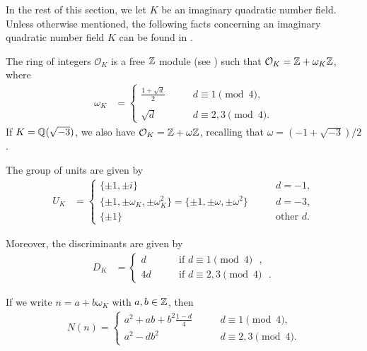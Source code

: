 \documentclass[twoside,leqno,10pt, A4]{amsart}
\begin{document}
In the rest of this section, we let $K$ be an imaginary quadratic number field. Unless otherwise mentioned, the following facts concerning an imaginary quadratic number field $K$ can be found in \cite[Section 3.8]{iwakow}. \newline

  The ring of integers $\mathcal{O}_K$ is a free $\mathbb Z$ module (see \cite[Section 3.8]{iwakow}) such that $\mathcal{O}_K=\mathbb Z+\omega_K \mathbb Z$, where
\begin{align*}
   \omega_K & =\begin{cases}
\displaystyle     \frac {1+\sqrt{d}}{2} \qquad & d \equiv 1 \pmod 4, \\ \\
     \sqrt{d} \qquad & d \equiv 2, 3 \pmod 4.
    \end{cases}
\end{align*}
If $K=\mathbb Q(\sqrt{-3})$, we also have $\mathcal{O}_K=\mathbb Z+\omega \mathbb Z$, recalling that $\omega=(-1+\sqrt{-3})/2$. \newline

   The group of units are given by
\begin{align}
\label{Uk}
   U_K & =\begin{cases}
     \{ \pm 1 , \pm i \} \qquad & d=-1, \\
     \{ \pm 1, \pm \omega_K, \pm \omega_K^2 \}=\{ \pm 1, \pm \omega, \pm \omega^2 \} \qquad & d=-3,  \\
     \{ \pm 1  \} \qquad & \text{other $d$}.
    \end{cases}
\end{align}

  Moreover, the discriminants are given by
\begin{align*}
   D_K & =\begin{cases}
     d \qquad & \text{if $d \equiv 1 \pmod 4$ }, \\
     4d \qquad & \text{if $d \equiv 2, 3 \pmod 4$ }.
    \end{cases}
\end{align*}

If we write $n=a+b\omega_K$ with $a, b \in \mathbb Z$, then
\begin{align*}
 N(n)=\begin{cases}
   \displaystyle  a^2+ab+b^2\frac {1-d}{4} \qquad & d \equiv 1 \pmod 4,  \\
   \displaystyle  a^2-db^2 \qquad &  d \equiv 2, 3 \pmod 4.
    \end{cases}
\end{align*}
\end{document}
